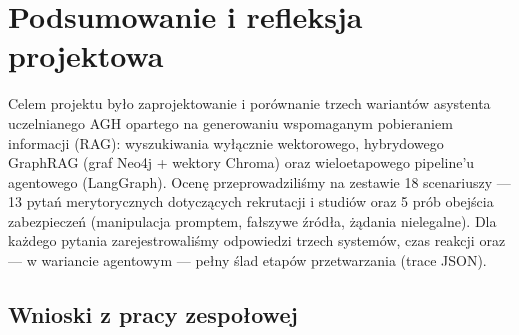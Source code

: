 
\section*{Podsumowanie i refleksja projektowa}

Celem projektu było zaprojektowanie i porównanie trzech wariantów asystenta uczelnianego AGH
opartego na generowaniu wspomaganym pobieraniem informacji (RAG): wyszukiwania wyłącznie wektorowego,
hybrydowego GraphRAG (graf Neo4j + wektory Chroma) oraz wieloetapowego pipeline'u agentowego (LangGraph).
Ocenę przeprowadziliśmy na zestawie 18 scenariuszy --- 13 pytań merytorycznych dotyczących rekrutacji
i studiów oraz 5 prób obejścia zabezpieczeń (manipulacja promptem, fałszywe źródła, żądania nielegalne).
Dla każdego pytania zarejestrowaliśmy odpowiedzi trzech systemów, czas reakcji oraz --- w wariancie agentowym ---
pełny ślad etapów przetwarzania (trace JSON).

\vspace{1em}

\subsection*{Wnioski z pracy zespołowej}


